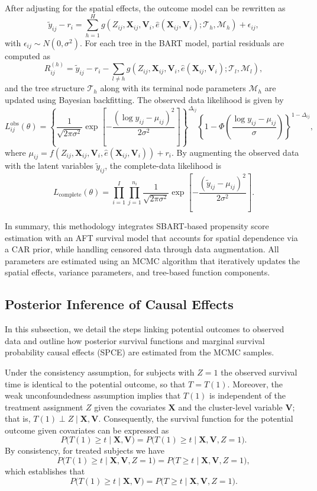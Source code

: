 \documentclass[useAMS,referee]{biom}
\begin{document}
After adjusting for the spatial effects, the outcome model can be rewritten as
\[
\tilde{y}_{ij} - r_i = \sum_{h=1}^{H} g(Z_{ij},\bm{X}_{ij},\bm{V}_i,\hat{e}(\bm{X}_{ij},\bm{V}_i);\mathcal{T}_h,\mathcal{M}_h) + \epsilon_{ij},
\]
with \(\epsilon_{ij}\sim N(0,\sigma^2)\). For each tree in the BART model, partial residuals are computed as
\[
R_{ij}^{(h)} = \tilde{y}_{ij} - r_i - \sum_{l\neq h} g(Z_{ij},\bm{X}_{ij},\bm{V}_i,\hat{e}(\bm{X}_{ij},\bm{V}_i);\mathcal{T}_l,\mathcal{M}_l),
\]
and the tree structure \(\mathcal{T}_h\) along  with its terminal node parameters \(\mathcal{M}_h\) are updated using Bayesian backfitting. The observed data likelihood is given by
\[
L_{ij}^{\text{obs}}(\theta) = \left\{\frac{1}{\sqrt{2\pi\sigma^2}} \exp\!\left[-\frac{(\log y_{ij}-\mu_{ij})^2}{2\sigma^2}\right]\right\}^{\Delta_{ij}} \left\{1-\Phi\!\left(\frac{\log y_{ij}-\mu_{ij}}{\sigma}\right)\right\}^{1-\Delta_{ij}},
\]
where \(\mu_{ij} = f(Z_{ij},\bm{X}_{ij},\bm{V}_i,\hat{e}(\bm{X}_{ij},\bm{V}_i)) + r_i\). By augmenting the observed data with the latent variables \(\tilde{y}_{ij}\), the complete-data likelihood is
\[
L_{\text{complete}}(\theta) = \prod_{i=1}^{I}\prod_{j=1}^{n_i} \frac{1}{\sqrt{2\pi\sigma^2}} \exp\!\left[-\frac{(\tilde{y}_{ij}-\mu_{ij})^2}{2\sigma^2}\right].
\]

In summary, this methodology integrates SBART-based propensity score estimation with an AFT survival model that accounts for spatial dependence via a CAR prior, while handling censored data through data augmentation. All parameters are estimated using an MCMC algorithm that iteratively updates the spatial effects, variance parameters, and tree-based function components.


\subsection{Posterior Inference of Causal Effects}

In this subsection, we detail the steps linking potential outcomes to observed data and outline how posterior survival functions and marginal survival probability causal effects (SPCE) are estimated from the MCMC samples.

Under the consistency assumption, for subjects with \(Z=1\) the observed survival time is identical to the potential outcome, so that \(T = T(1)\). Moreover, the weak unconfoundedness assumption implies that \(T(1)\) is independent of the treatment assignment \(Z\) given the covariates \(\bm{X}\) and the cluster-level variable \(\bm{V}\); that is, \(T(1) \perp Z \mid \bm{X},\bm{V}\). Consequently, the survival function for the potential outcome given covariates can be expressed as 
\[
P\bigl(T(1) \ge t \mid \bm{X},\bm{V}\bigr) = P\bigl(T(1) \ge t \mid \bm{X},\bm{V},Z=1\bigr).
\]
By consistency, for treated subjects we have
\[
P\bigl(T(1) \ge t \mid \bm{X},\bm{V},Z=1\bigr) = P\bigl(T \ge t \mid \bm{X},\bm{V},Z=1\bigr),
\]
which establishes that
\[
P\bigl(T(1) \ge t \mid \bm{X},\bm{V}\bigr) = P\bigl(T \ge t \mid \bm{X},\bm{V},Z=1\bigr).
\]
\end{document}
